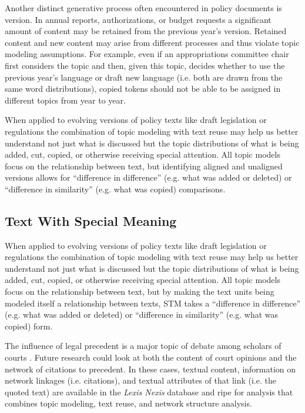 \documentclass{article}
\begin{document}
Another distinct generative process often encountered in policy documents is version. In annual reports, authorizations, or budget requests a significant amount of content may be retained from the previous year's version. Retained content and new content may arise from different processes and thus violate topic modeling assumptions. For example, even if an appropriations committee chair first considers the topic and then, given this topic, decides whether to use the previous year's language or draft new language (i.e. both are drawn from the same word distributions), copied tokens should not be able to be assigned in different topics from year to year. 

When applied to evolving versions of policy texts like draft legislation or regulations the combination of topic modeling with text reuse may help us better understand not just what is discussed but the topic distributions of what is being added, cut, copied, or otherwise receiving special attention. All topic models focus on the relationship between text, but identifying aligned and unaligned versions allows for ``difference in difference'' (e.g. what was added or deleted) or ``difference in similarity'' (e.g. what was copied) comparisons. 



\subsection{Text With Special Meaning}



When applied to evolving versions of policy texts like draft legislation or regulations the combination of topic modeling with text reuse may help us better understand not just what is discussed but the topic distributions of what is being added, cut, copied, or otherwise receiving special attention. All topic models focus on the relationship between text, but by making the text units being modeled itself a relationship between texts, STM takes a ``difference in difference'' (e.g. what was added or deleted) or ``difference in similarity'' (e.g. what was copied) form. 

The influence of legal precedent is a major topic of debate among scholars of courts \citep{Lupu2013}. Future research could look at both the content of court opinions and the network of citations to precedent. In these cases, textual content, information on network linkages (i.e. citations), and textual attributes of that link (i.e. the quoted text) are available in the\textit{ Lexis Nexis} database and ripe for analysis that combines topic modeling, text reuse, and network structure analysis. 
\end{document}
